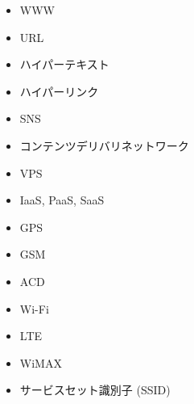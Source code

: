 \documentclass[a4j, titlepage, 11pt]{jsarticle}
\begin{document}
\begin{multicols}{3}
\begin{itemize}
	\item WWW
	\item URL
	\item ハイパーテキスト
	\item ハイパーリンク
	\item SNS
	\item コンテンツデリバリネットワーク
	\item VPS
	\item IaaS, PaaS, SaaS
	\item GPS
	\item GSM
	\item ACD
	\item Wi-Fi
	\item LTE
	\item WiMAX
	\item サービスセット識別子 (SSID)
\end{itemize}
\end{multicols}

\clearpage
\end{document}
